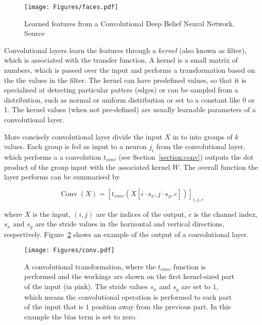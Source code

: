 \begin{figure}[ht!]
	\begin{center}
		\texttt{[image: Figures/faces.pdf]}
	\end{center}
	\caption{Learned features from a Convolutional Deep Belief Neural Network. Source~\cite{LeeGRN09}}
	\label{Fig:faces}
\end{figure} 

Convolutional layers learn the features through a \textit{kernel} (also known as filter), which is associated with the transfer function. A kernel is a small matrix of numbers, which is passed over the input and performs a transformation based on the the values in the filter. The kernel can have predefined values, so that it is specialised at detecting particular patters (\eg edges) or can be sampled from a distribution, such as normal or uniform distribution or set to a constant like 0 or 1. The kernel values (when not pre-defined) are usually learnable parameters of a convolutional layer.

More concisely convolutional layer divide the input $X$ in to into groups of $k$ values. Each group is fed as input to a neuron $j_i$ from the convolutional layer, which performs a a convolution  $t_{conv}$ (see Section~\ref{section:conv}) outputs the dot product of the group input with the associated kernel $W$. The overall function the layer performs can be summarised by 

\begin{equation}
\operatorname{Conv}(X)= [t_{conv}(X[i \cdot s_x, j \cdot s_y, c])]_{i,j,c}
\label{eq:maxlayer}
\end{equation}

where $X$ is the input, $(i,j)$ are the indices of the output, $c$ is the channel index, $s_x$ and $s_y$ are the stride values in the horizontal and vertical directions, respectively. Figure~\ref{Fig:conv} shows an example of the output of a convolutional layer.

\begin{figure}[ht!]
	\begin{center}
		\texttt{[image: Figures/conv.pdf]}
	\end{center}
	\caption{A convolutional transformation, where the $t_{conv}$ function is performed and the workings are shown on the first kernel-sized part of the input (in pink). The stride values $s_x$ and $s_y$ are set to $1$, which means the convolutional operation is performed to each part of the input that is $1$ position away from the previous part. In this example the bias term is set to zero.}
	\label{Fig:conv}
\end{figure} 

